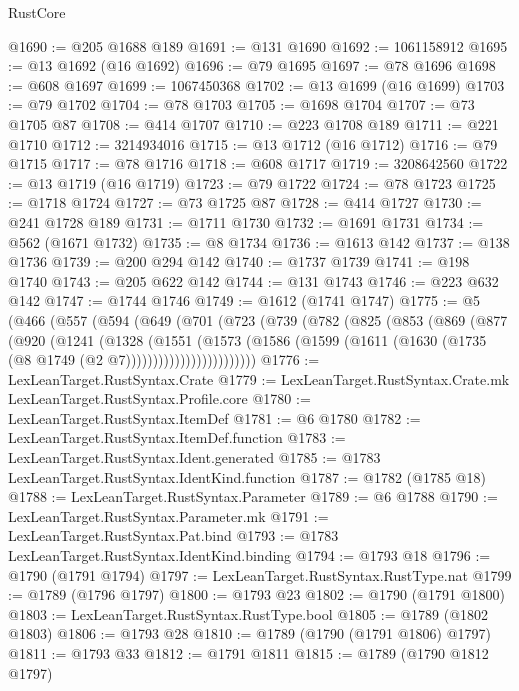\begin{lexlean}{RustCore}
\begin{coremodule}
@1690 := @205 @1688 @189
@1691 := @131 @1690
@1692 := 1061158912
@1695 := @13 @1692 (@16 @1692)
@1696 := @79 @1695
@1697 := @78 @1696
@1698 := @608 @1697
@1699 := 1067450368
@1702 := @13 @1699 (@16 @1699)
@1703 := @79 @1702
@1704 := @78 @1703
@1705 := @1698 @1704
@1707 := @73 @1705 @87
@1708 := @414 @1707
@1710 := @223 @1708 @189
@1711 := @221 @1710
@1712 := 3214934016
@1715 := @13 @1712 (@16 @1712)
@1716 := @79 @1715
@1717 := @78 @1716
@1718 := @608 @1717
@1719 := 3208642560
@1722 := @13 @1719 (@16 @1719)
@1723 := @79 @1722
@1724 := @78 @1723
@1725 := @1718 @1724
@1727 := @73 @1725 @87
@1728 := @414 @1727
@1730 := @241 @1728 @189
@1731 := @1711 @1730
@1732 := @1691 @1731
@1734 := @562 (@1671 @1732)
@1735 := @8 @1734
@1736 := @1613 @142
@1737 := @138 @1736
@1739 := @200 @294 @142
@1740 := @1737 @1739
@1741 := @198 @1740
@1743 := @205 @622 @142
@1744 := @131 @1743
@1746 := @223 @632 @142
@1747 := @1744 @1746
@1749 := @1612 (@1741 @1747)
@1775 := @5
    (@466
      (@557
        (@594
          (@649
            (@701
              (@723
                (@739
                  (@782
                    (@825
                      (@853
                        (@869
                          (@877
                            (@920
                              (@1241
                                (@1328
                                  (@1551
                                    (@1573
                                      (@1586
                                        (@1599
                                          (@1611
                                            (@1630 (@1735 (@8 @1749 (@2 @7))))))))))))))))))))))))
@1776 := LexLeanTarget.RustSyntax.Crate
@1779 := LexLeanTarget.RustSyntax.Crate.mk LexLeanTarget.RustSyntax.Profile.core
@1780 := LexLeanTarget.RustSyntax.ItemDef
@1781 := @6 @1780
@1782 := LexLeanTarget.RustSyntax.ItemDef.function
@1783 := LexLeanTarget.RustSyntax.Ident.generated
@1785 := @1783 LexLeanTarget.RustSyntax.IdentKind.function
@1787 := @1782 (@1785 @18)
@1788 := LexLeanTarget.RustSyntax.Parameter
@1789 := @6 @1788
@1790 := LexLeanTarget.RustSyntax.Parameter.mk
@1791 := LexLeanTarget.RustSyntax.Pat.bind
@1793 := @1783 LexLeanTarget.RustSyntax.IdentKind.binding
@1794 := @1793 @18
@1796 := @1790 (@1791 @1794)
@1797 := LexLeanTarget.RustSyntax.RustType.nat
@1799 := @1789 (@1796 @1797)
@1800 := @1793 @23
@1802 := @1790 (@1791 @1800)
@1803 := LexLeanTarget.RustSyntax.RustType.bool
@1805 := @1789 (@1802 @1803)
@1806 := @1793 @28
@1810 := @1789 (@1790 (@1791 @1806) @1797)
@1811 := @1793 @33
@1812 := @1791 @1811
@1815 := @1789 (@1790 @1812 @1797)

\end{coremodule}
\end{lexlean}
